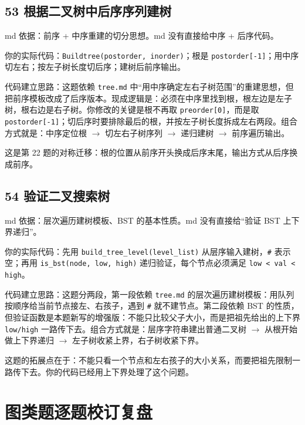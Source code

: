 \documentclass[10pt,a4paper,fontset=none]{ctexart}
\begin{document}
\subsection{53 根据二叉树中后序序列建树}
\begin{sourcebox}
md 依据：前序 + 中序重建的切分思想。md 没有直接给中序 + 后序代码。
\end{sourcebox}
\begin{methodbox}
你的实际代码：\texttt{Buildtree(postorder, inorder)}；根是 \texttt{postorder[-1]}；用中序切左右；按左子树长度切后序；建树后前序输出。

代码建立思路：这题依赖 \texttt{tree.md} 中“用中序确定左右子树范围”的重建思想，但把前序模板改成了后序版本。现成逻辑是：必须在中序里找到根，根左边是左子树，根右边是右子树。你修改的关键是根不再取 \texttt{preorder[0]}，而是取 \texttt{postorder[-1]}；切后序时要排除最后的根，并按左子树长度拆成左右两段。组合方式就是：中序定位根 $\rightarrow$ 切左右子树序列 $\rightarrow$ 递归建树 $\rightarrow$ 前序遍历输出。
\end{methodbox}
这是第 22 题的对称迁移：根的位置从前序开头换成后序末尾，输出方式从后序换成前序。

\subsection{54 验证二叉搜索树}
\begin{sourcebox}
md 依据：层次遍历建树模板、BST 的基本性质。md 没有直接给“验证 BST 上下界递归”。
\end{sourcebox}
\begin{methodbox}
你的实际代码：先用 \texttt{build\_tree\_level(level\_list)} 从层序输入建树，\texttt{\#} 表示空；再用 \texttt{is\_bst(node, low, high)} 递归验证，每个节点必须满足 \texttt{low < val < high}。

代码建立思路：这题分两段，第一段依赖 \texttt{tree.md} 的层次遍历建树模板：用队列按顺序给当前节点接左、右孩子，遇到 \texttt{\#} 就不建节点。第二段依赖 BST 的性质，但验证函数是本题新写的增强版：不能只比较父子大小，而是把祖先给出的上下界 \texttt{low/high} 一路传下去。组合方式就是：层序字符串建出普通二叉树 $\rightarrow$ 从根开始做上下界递归 $\rightarrow$ 左子树收紧上界，右子树收紧下界。
\end{methodbox}
这题的拓展点在于：不能只看一个节点和左右孩子的大小关系，而要把祖先限制一路传下去。你的代码已经用上下界处理了这个问题。

\section{图类题逐题校订复盘}
\end{document}
